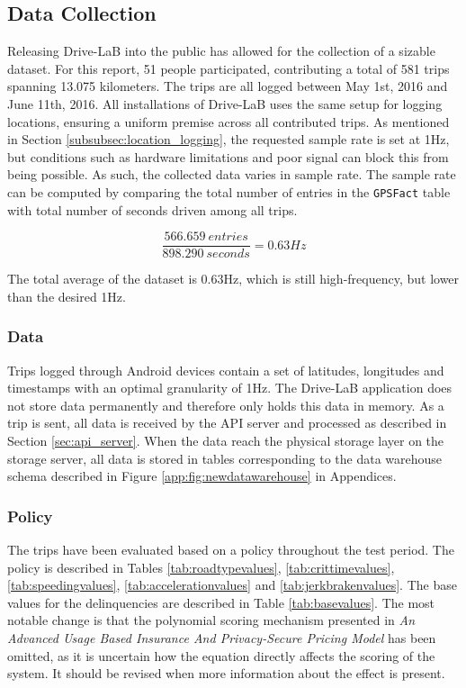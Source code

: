 \subsection{Data Collection}\label{sec:datacollection}
Releasing Drive-LaB into the public has allowed for the collection of a sizable dataset. For this report, 51 people participated, contributing a total of 581 trips spanning 13.075 kilometers. The trips are all logged between May 1st, 2016 and June 11th, 2016. All installations of Drive-LaB uses the same setup for logging locations, ensuring a uniform premise across all contributed trips. As mentioned in Section \ref{subsubsec:location_logging}, the requested sample rate is set at 1Hz, but conditions such as hardware limitations and poor signal can block this from being possible. As such, the collected data varies in sample rate. The sample rate can be computed by comparing the total number of entries in the \texttt{GPSFact} table with total number of seconds driven among all trips.  

\begin{equation}
\frac{566.659 \ entries}{898.290 \ seconds}= 0.63Hz
\end{equation}

The total average of the dataset is 0.63Hz, which is still high-frequency, but lower than the desired 1Hz.

\subsubsection{Data}\label{subsec:data}
Trips logged through Android devices contain a set of latitudes, longitudes and timestamps with an optimal granularity of 1Hz. The Drive-LaB application does not store data permanently and therefore only holds this data in memory. As a trip is sent, all data is received by the API server and processed as described in Section \ref{sec:api_server}. When the data reach the physical storage layer on the storage server, all data is stored in tables corresponding to the data warehouse schema described in Figure \ref{app:fig:newdatawarehouse} in Appendices. 

\subsubsection{Policy}\label{subsec:policy}
The trips have been evaluated based on a policy throughout the test period. The policy is described in Tables \ref{tab:roadtypevalues}, \ref{tab:crittimevalues}, \ref{tab:speedingvalues}, \ref{tab:accelerationvalues} and \ref{tab:jerkbrakenvalues}. The base values for the delinquencies are described in Table \ref{tab:basevalues}. The most notable change is that the polynomial scoring mechanism presented in \textit{An Advanced Usage Based Insurance And Privacy-Secure Pricing Model} \citep{sw9_report} has been omitted, as it is uncertain how the equation directly affects the scoring of the system. It should be revised when more information about the effect is present.

